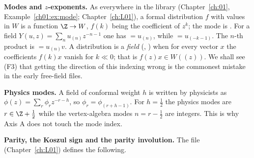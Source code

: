 \textbf{Modes and $z$-exponents.} As everywhere in the library (Chapter~\ref{ch:01},
Example~\ref{ch01:ex:mode}; Chapter~\ref{ch:L01}), a formal distribution $f$ with values in $W$ is a
function $\Z\to W$, $f(k)$ being the coefficient of $z^k$; the mode is
. For a field $Y(u,z)=\sum_nu_{(n)}z^{-n-1}$ one has
 $=u_{(n)}$, while  $=u_{(-k-1)}$. The $n$-th product is
 $=u_{(n)}v$. A distribution is a \emph{field}
(, ) when for every vector $x$ the coefficients
$f(k)x$ vanish for $k\ll0$; that is $f(z)x\in W((z))$. We shall see (F3) that getting the
direction of this indexing wrong is the commonest mistake in the early free-field files.

\textbf{Physics modes.} A field of conformal weight $h$ is written by physicists as
$\phi(z)=\sum_r\phi_rz^{-r-h}$, so $\phi_r=\phi_{(r+h-1)}$. For $h=\tfrac12$ the physics modes are
$r\in\Z+\tfrac12$ while the vertex-algebra modes $n=r-\tfrac12$ are integers. This is why Axis A
does not touch the mode index.

\textbf{Parity, the Koszul sign and the parity involution.} The file
 (Chapter~\ref{ch:L01}) defines the following.


